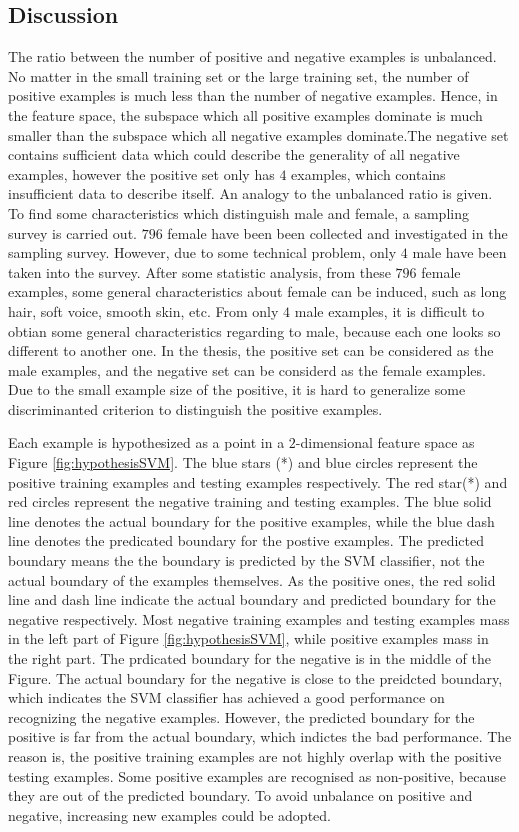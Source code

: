 \subsection{Discussion}
The ratio between the number of positive and negative examples is unbalanced. No matter in the small training set or the large training set, the number of positive examples is much less than the number of negative examples. Hence, in the feature space, the subspace which all positive examples dominate is much smaller than the subspace which all negative examples dominate.The negative set contains sufficient data which could describe the generality of all negative examples, however the positive set only has $4$ examples, which contains insufficient data to describe itself.  An analogy to the unbalanced ratio is given. To find some characteristics which distinguish male and female, a sampling survey is carried out. $796$ female have been been collected and investigated in the sampling survey. However, due to some technical problem, only $4$ male have been taken into the survey. After some statistic analysis, from these $796$ female examples, some general characteristics about female can be induced, such as long hair, soft voice, smooth skin, etc. From only $4$ male examples, it is difficult to obtian some general characteristics regarding to male, because each one looks so different to another one. In the thesis, the positive set can be considered as the male examples, and the negative set can be considerd as the female examples.  Due to the small example size of the positive, it is hard to generalize some discriminanted criterion to distinguish the positive examples. 

Each example is hypothesized as a point in a $2$-dimensional feature space as \mbox{Figure} \ref{fig:hypothesisSVM}. The blue stars (*) and blue circles represent the positive training examples and testing examples respectively. The red star(*) and red circles represent the negative training and testing examples. The blue solid line denotes the actual boundary for the positive examples, while the blue dash line denotes the predicated boundary for the postive examples. The predicted boundary means the the boundary is predicted by the SVM classifier, not the actual boundary of the examples themselves. As the positive ones, the red solid line and dash line indicate the actual boundary and predicted boundary for the negative respectively. Most negative training examples and testing examples mass in the left part of \mbox{Figure} \ref{fig:hypothesisSVM}, while positive examples mass in the right part. The prdicated boundary for the negative is in the middle of the Figure. The actual boundary for the negative is close to the preidcted boundary, which indicates the SVM classifier has achieved a good performance on recognizing the negative examples. However, the predicted boundary for the positive is far from the actual boundary, which indictes the bad performance. The reason is, the positive training examples are not highly overlap with the positive testing examples. Some positive examples are recognised as non-positive, because they are out of the predicted boundary. To avoid unbalance on positive and negative, increasing new examples could be adopted.

